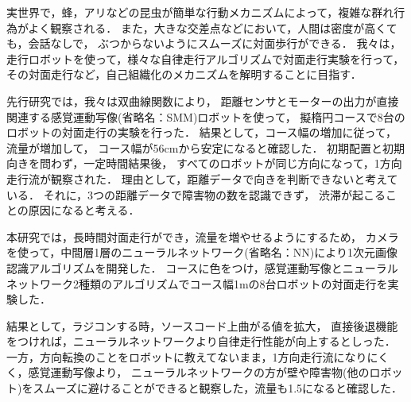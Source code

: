 実世界で，蜂，アリなどの昆虫が簡単な行動メカニズムによって，複雑な群れ行為がよく観察される．
また，大きな交差点などにおいて，人間は密度が高くても，会話なしで，
ぶつからないようにスムーズに対面歩行ができる．
我々は，走行ロボットを使って，様々な自律走行アルゴリズムで対面走行実験を行って，
その対面走行など，自己組織化のメカニズムを解明することに目指す．

先行研究\cite{li}では，我々は双曲線関数により，
距離センサとモーターの出力が直接関連する感覚運動写像(省略名：SMM)ロボットを使って，
擬楕円コースで8台のロボットの対面走行の実験を行った．
結果として，コース幅の増加に従って，流量が増加して，
コース幅が56cmから安定になると確認した．
初期配置と初期向きを問わず，一定時間結果後，
すべてのロボットが同じ方向になって，1方向走行流が観察された．
理由として，距離データで向きを判断できないと考えている．
それに，3つの距離データで障害物の数を認識できず，
渋滞が起こることの原因になると考える．

本研究では，長時間対面走行ができ，流量を増やせるようにするため，
カメラを使って，中間層1層のニューラルネットワーク(省略名：NN)により1次元画像認識アルゴリズムを開発した．
コースに色をつけ，感覚運動写像とニューラルネットワーク2種類のアルゴリズムでコース幅1mの8台ロボットの対面走行を実験した．

結果として，ラジコンする時，ソースコード上曲がる値を拡大，
直接後退機能をつければ，ニューラルネットワークより自律走行性能が向上するとしった．
一方，方向転換のことをロボットに教えてないまま，1方向走行流になりにくく，感覚運動写像より，
ニューラルネットワークの方が壁や障害物(他のロボット)をスムーズに避けることができると観察した，流量も1.5になると確認した．

